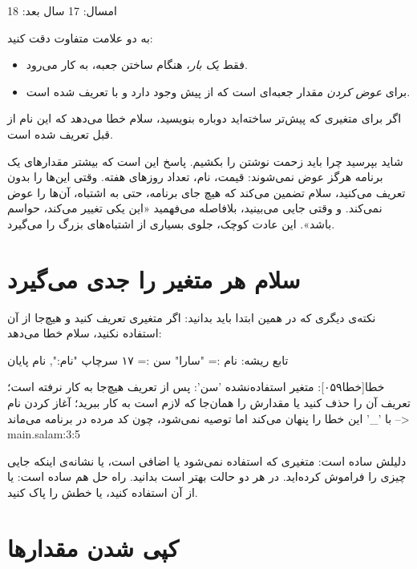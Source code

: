 \begin{outputfa}
امسال: 17
سال بعد: 18
\end{outputfa}

به دو علامت متفاوت دقت کنید:
\begin{itemize}
  \item \code{:=} فقط \emph{یک بار}، هنگام ساختن جعبه، به کار می‌رود.
  \item \code{=} برای \emph{عوض کردن} مقدار جعبه‌ای است که از پیش وجود
        دارد و با  تعریف شده است.
\end{itemize}
اگر برای متغیری که پیش‌تر ساخته‌اید دوباره \code{:=} بنویسید، سلام خطا
می‌دهد که این نام از قبل تعریف شده است.

\begin{note}
شاید بپرسید چرا باید زحمت نوشتن  را بکشیم. پاسخ این است که
بیشتر مقدارهای یک برنامه هرگز عوض نمی‌شوند: قیمت، نام، تعداد روزهای هفته.
وقتی این‌ها را بدون  تعریف می‌کنید، سلام تضمین می‌کند که هیچ
جای برنامه، حتی به اشتباه، آن‌ها را عوض نمی‌کند. و وقتی جایی 
می‌بینید، بلافاصله می‌فهمید «این یکی تغییر می‌کند، حواسم باشد». این عادت
کوچک، جلوی بسیاری از اشتباه‌های بزرگ را می‌گیرد.
\end{note}

\section{سلام هر متغیر را جدی می‌گیرد}

نکته‌ی دیگری که در همین ابتدا باید بدانید: اگر متغیری تعریف کنید و هیچ‌جا
از آن استفاده نکنید، سلام خطا می‌دهد:

\begin{salamfa}
تابع ریشه:
    نام := "سارا"
    سن := ۱۷
    سرچاپ "نام:", نام
پایان
\end{salamfa}

\begin{outputfa}
خطا[خطا۰۵۹]: متغیر استفاده‌نشده 'سن': پس از تعریف هیچ‌جا به کار نرفته است؛
تعریف آن را حذف کنید یا مقدارش را همان‌جا که لازم است به کار ببرید؛
آغاز کردن نام با '_' این خطا را پنهان می‌کند اما توصیه نمی‌شود،
چون کد مرده در برنامه می‌ماند
 --> main.salam:3:5
\end{outputfa}

دلیلش ساده است: متغیری که استفاده نمی‌شود یا اضافی است، یا نشانه‌ی اینکه
جایی چیزی را فراموش کرده‌اید. در هر دو حالت بهتر است بدانید. راه حل هم
ساده است: یا از آن استفاده کنید، یا خطش را پاک کنید.

\section{کپی شدن مقدارها}

